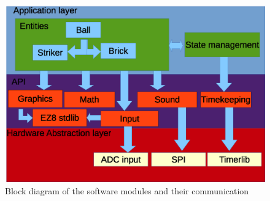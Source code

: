 \begin{figure}
	\center
	\includegraphics[scale=0.7]{pictures/architecture_block.eps}
	\caption{Block diagram of the software modules and their communication}
	\label{architecture_block}
\end{figure}
